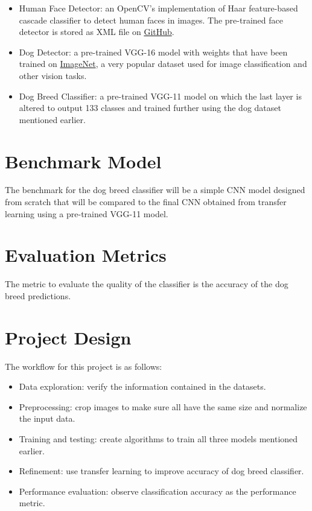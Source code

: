 \documentclass{article}
\begin{document}
    \begin{itemize}
        \item Human Face Detector: an OpenCV's implementation of Haar feature-based cascade classifier to detect human faces in images. The pre-trained face detector is stored as XML file on \href{https://github.com/opencv/opencv/tree/master/data/haarcascades}{GitHub}.
        
        \item Dog Detector: a pre-trained VGG-16 model with weights that have been trained on \href{https://image-net.org/}{ImageNet}, a very popular dataset used for image classification and other vision tasks.
        
        \item Dog Breed Classifier: a pre-trained VGG-11 model on which the last layer is altered to output 133 classes and trained further using the dog dataset mentioned earlier.
    \end{itemize}

    \section{Benchmark Model}
    The benchmark for the dog breed classifier will be a simple CNN model designed from scratch that will be compared to the final CNN obtained from transfer learning using a pre-trained VGG-11 model.

    \section{Evaluation Metrics}
    The metric to evaluate the quality of the classifier is the accuracy of the dog breed predictions.

    \section{Project Design}
    The workflow for this project is as follows:

    \begin{itemize}
        \item Data exploration: verify the information contained in the datasets.
        \item Preprocessing: crop images to make sure all have the same size and normalize the input data.
        \item Training and testing: create algorithms to train all three models mentioned earlier.
        \item Refinement: use transfer learning to improve accuracy of dog breed classifier.
        \item Performance evaluation: observe classification accuracy as the performance metric.
    \end{itemize}
\end{document}
